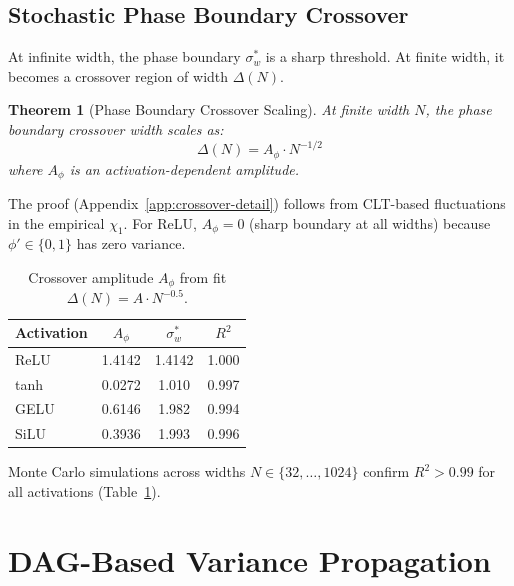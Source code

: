 \documentclass[10pt]{article}
\newtheorem{theorem}{Theorem}
\begin{document}
\subsection{Stochastic Phase Boundary Crossover}
\label{sec:crossover}

At infinite width, the phase boundary $\sigma_w^*$ is a sharp threshold.
At finite width, it becomes a crossover region of width $\Delta(N)$.

\begin{theorem}[Phase Boundary Crossover Scaling]
\label{thm:crossover}
At finite width $N$, the phase boundary crossover width scales as:
\begin{equation}
    \Delta(N) = A_\phi \cdot N^{-1/2}
    \label{eq:crossover-scaling}
\end{equation}
where $A_\phi$ is an activation-dependent amplitude.
\end{theorem}

The proof (Appendix~\ref{app:crossover-detail}) follows from CLT-based fluctuations in the empirical $\chi_1$.
For ReLU, $A_\phi = 0$ (sharp boundary at all widths) because $\phi' \in \{0,1\}$ has zero variance.

\begin{table}[t]
\centering
\caption{Crossover amplitude $A_\phi$ from fit $\Delta(N) = A \cdot N^{-0.5}$.}
\label{tab:crossover}
\small
\begin{tabular}{@{}lccc@{}}
\toprule
\textbf{Activation} & $A_\phi$ & $\sigma_w^*$ & $R^2$ \\
\midrule
ReLU  & 1.4142 & 1.4142 & 1.000 \\
tanh  & 0.0272 & 1.010  & 0.997 \\
GELU  & 0.6146 & 1.982  & 0.994 \\
SiLU  & 0.3936 & 1.993  & 0.996 \\
\bottomrule
\end{tabular}
\end{table}

Monte Carlo simulations across widths $N \in \{32, \ldots, 1024\}$ confirm $R^2 > 0.99$ for all activations (Table~\ref{tab:crossover}).

\section{DAG-Based Variance Propagation}
\label{sec:arbitrary-graphs}
\end{document}
